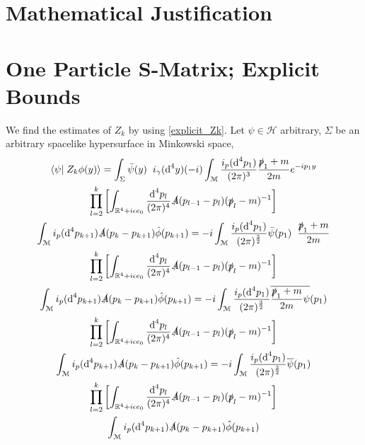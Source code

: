 \documentclass[b5paper,draft,openbib,12pt]{memoir}
\begin{document}
\chapter{Mathematical Justification}


\appendix

\chapter[One Particle S-Matrix; Explicit Bounds][Explicit Bounds]{One Particle S-Matrix; Explicit Bounds}

We find the estimates of \(Z_k\) by using \eqref{explicit_Zk}. Let \(\psi \in \mathcal{H}\) arbitrary, \(\Sigma\) be an arbitrary spacelike hypersurface in Minkowski space,
\begin{multline*}
\left<\psi\right| \left. Z_k\phi(y)\right>= \int_{\Sigma} \bar{\psi}(y)\hspace{0.2cm} i_{\gamma} (\text{d}^4 y) (- i)  \int_{\mathcal{M}}\frac{i_p(\text{d}^4p_1)}{(2\pi)^{3}} \frac{\slashed{p}_1+m}{2m} e^{-ip_1y}  \\
  \prod_{l=2}^{k} \left[ \int_{\mathbb{R}^4+i \epsilon e_0}\frac{\text{d}^4p_l}{(2\pi)^{4}} \slashed{A}(p_{l-1}-p_l)  (\slashed{p}_l-m)^{-1}  
 \right]\\
 \int_{\mathcal{M}}  i_p(\text{d}^4p_{k+1})\slashed{A}(p_{k}-p_{k+1})\hat{\phi}(p_{k+1})
 =  - i  \int_{\mathcal{M}}\frac{i_p(\text{d}^4p_1)}{(2\pi)^{\frac{3}{2}}}\bar{\psi}(p_1)\hspace{0.2cm}  \frac{\slashed{p}_1+m}{2m}   \\
  \prod_{l=2}^{k} \left[ \int_{\mathbb{R}^4+i \epsilon e_0}\frac{\text{d}^4p_l}{(2\pi)^{4}} \slashed{A}(p_{l-1}-p_l)  (\slashed{p}_l-m)^{-1}  
 \right]\\
 \int_{\mathcal{M}}  i_p(\text{d}^4p_{k+1})\slashed{A}(p_{k}-p_{k+1})\hat{\phi}(p_{k+1})
  =  - i  \int_{\mathcal{M}}\frac{i_p(\text{d}^4p_1)}{(2\pi)^{\frac{3}{2}}}\overline{ \frac{\slashed{p}_1+m}{2m}\psi}(p_1)   \\
  \prod_{l=2}^{k} \left[ \int_{\mathbb{R}^4+i \epsilon e_0}\frac{\text{d}^4p_l}{(2\pi)^{4}} \slashed{A}(p_{l-1}-p_l)  (\slashed{p}_l-m)^{-1}  
 \right]\\
 \int_{\mathcal{M}}  i_p(\text{d}^4p_{k+1})\slashed{A}(p_{k}-p_{k+1})\hat{\phi}(p_{k+1})
   =  - i  \int_{\mathcal{M}}\frac{i_p(\text{d}^4p_1)}{(2\pi)^{\frac{3}{2}}}\overline{\psi}(p_1)   \\
  \prod_{l=2}^{k} \left[ \int_{\mathbb{R}^4+i \epsilon e_0}\frac{\text{d}^4p_l}{(2\pi)^{4}} \slashed{A}(p_{l-1}-p_l)  (\slashed{p}_l-m)^{-1}  
 \right]\\
 \int_{\mathcal{M}}  i_p(\text{d}^4p_{k+1})\slashed{A}(p_{k}-p_{k+1})\hat{\phi}(p_{k+1})
\end{multline*}
\end{document}

